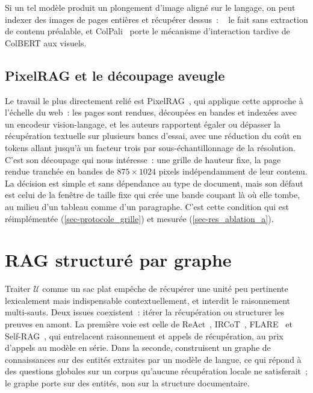Si un tel modèle produit un plongement d'image aligné sur le langage, on peut
indexer des images de pages entières et récupérer dessus~: ~\citep{dse2024} le fait sans extraction de contenu
préalable, et ColPali~\citep{colpali2024} porte le mécanisme d'interaction
tardive de ColBERT aux  visuels.

\subsection{PixelRAG et le découpage aveugle}
\label{sec-eda_pixelrag}

Le travail le plus directement relié est PixelRAG~\citep{pixelrag2026}, qui
applique cette approche à l'échelle du web~: les pages sont rendues, découpées
en bandes et indexées avec un encodeur vision-langage, et les auteurs
rapportent égaler ou dépasser la récupération textuelle sur plusieurs bancs
d'essai, avec une réduction du coût en tokens allant jusqu'à un facteur trois
par sous-échantillonnage de la résolution. C'est son découpage qui nous
intéresse~: une grille de hauteur fixe, la page rendue tranchée en bandes de
$\num{875} \times \num{1024}$ pixels indépendamment de leur contenu. La
décision est simple et sans dépendance au type de document, mais son défaut
est celui de la fenêtre de taille fixe qui crée une bande coupant là où elle tombe,
au milieu d'un tableau comme d'un paragraphe. C'est cette condition qui est
réimplémentée (\cref{sec-protocole_grille}) et mesurée
(\cref{sec-res_ablation_a}).

\section{RAG structuré par graphe}
\label{sec-eda_graphe}

Traiter $\mathcal{U}$ comme un sac plat empêche de récupérer une unité peu
pertinente lexicalement mais indispensable contextuellement, et interdit le
raisonnement multi-sauts. Deux issues coexistent~: itérer la récupération ou
structurer les preuves en amont. La première voie est celle de
ReAct~\citep{react2023}, IRCoT~\citep{ircot2023}, FLARE~\citep{flare2023} et
Self-RAG~\citep{selfrag2024}, qui entrelacent raisonnement et appels de
récupération, au prix d'appels au modèle en série. Dans la seconde,
\citet{graphrag2024} construisent un graphe de connaissances
sur des entités extraites par un modèle de langue, ce qui répond à des
questions globales sur un corpus qu'aucune récupération locale ne
satisferait~; le graphe porte sur des entités, non sur la structure
documentaire.

